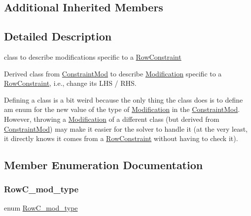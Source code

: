 \subsection*{Additional Inherited Members}


\subsection{Detailed Description}
class to describe modifications specific to a \mbox{\hyperlink{class_s_m_spp__di__unipi__it_1_1_row_constraint}{Row\+Constraint}} 

Derived class from \mbox{\hyperlink{class_s_m_spp__di__unipi__it_1_1_constraint_mod}{Constraint\+Mod}} to describe \mbox{\hyperlink{class_s_m_spp__di__unipi__it_1_1_modification}{Modification}} specific to a \mbox{\hyperlink{class_s_m_spp__di__unipi__it_1_1_row_constraint}{Row\+Constraint}}, i.\+e., change its L\+HS / R\+HS.

Defining a class is a bit weird because the only thing the class does is to define am enum for the new value of the type of \mbox{\hyperlink{class_s_m_spp__di__unipi__it_1_1_modification}{Modification}} in the \mbox{\hyperlink{class_s_m_spp__di__unipi__it_1_1_constraint_mod}{Constraint\+Mod}}. However, throwing a \mbox{\hyperlink{class_s_m_spp__di__unipi__it_1_1_modification}{Modification}} of a different class (but derived from \mbox{\hyperlink{class_s_m_spp__di__unipi__it_1_1_constraint_mod}{Constraint\+Mod}}) may make it easier for the solver to handle it (at the very least, it directly knows it comes from a \mbox{\hyperlink{class_s_m_spp__di__unipi__it_1_1_row_constraint}{Row\+Constraint}} without having to check it). 

\subsection{Member Enumeration Documentation}
\mbox{\label{class_s_m_spp__di__unipi__it_1_1_row_constraint_mod_af91e41a206e988d55a31347acd6f5d33}} 
\subsubsection{\texorpdfstring{Row\+C\+\_\+mod\+\_\+type}{RowC\_mod\_type}}
{\footnotesize\ttfamily enum \mbox{\hyperlink{class_s_m_spp__di__unipi__it_1_1_row_constraint_mod_af91e41a206e988d55a31347acd6f5d33}{Row\+C\+\_\+mod\+\_\+type}}}



